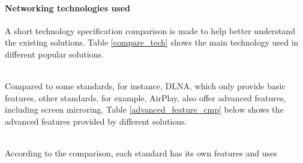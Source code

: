 \paragraph{Networking technologies used}
A short technology specification comparison is made to help better understand
the existing solutions. Table \ref{compare_tech} shows the main technology used 
in different popular solutions. \\
\begin{table}[htb] 
\caption{Comparison of used technologies\label{compare_tech}} 
\begin{center} 
\end{center} 
\end{table} 
\\
Compared to some standards, for instance, DLNA, which only provide basic features, other standards, for example, AirPlay, also offer advanced 
features, including screen mirroring. Table \ref{advanced_feature_cmp} below
shows the advanced features provided by different solutions.\\
\begin{table}[htb] 
\caption{Advanced feature comparison \label{advanced_feature_cmp}} 
\begin{center} 
\end{center} 
\end{table} 
\\
According to the comparison, each standard has its own features and uses 
